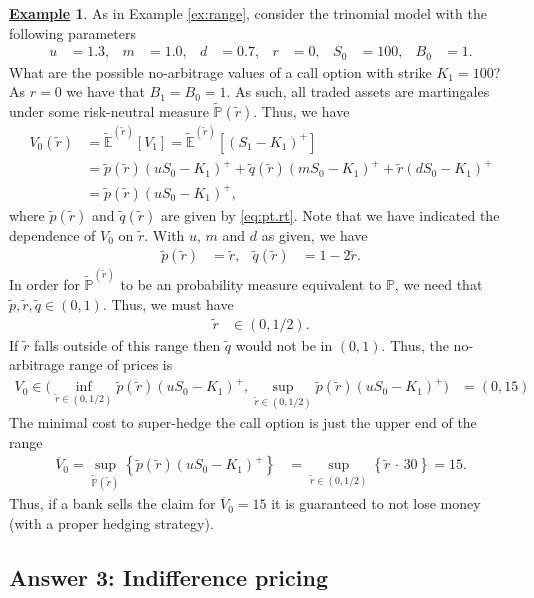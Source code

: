 \documentclass[12pt]{book}
\numberwithin{equation}{chapter}
\theoremstyle{plain}
\numberwithin{theorem}{section}
\theoremstyle{definition}
\newtheorem{example}[theorem]{\underline{Example}}
\numberwithin{exercise}{chapter}
\newcommand{\<}{\langle}
\renewcommand{\>}{\rangle}
\renewcommand{\(}{\left(}
\renewcommand{\)}{\right)}
\renewcommand{\[}{\left[}
\renewcommand{\]}{\right]}
\newcommand\Eb{\mathds{E}}
\newcommand\Pb{\mathds{P}}
\newcommand\Ebt{\widetilde{\Eb}}
\newcommand\Pbt{\widetilde{\Pb}}
\newcommand\qt{\widetilde{q}}
\newcommand\rt{\widetilde{r}}
\newcommand{\blu}[1]{\textcolor{blue}{#1}}
\theoremstyle{definition}
\numberwithin{question}{section}
\newcommand\pt{\widetilde{p}}
\begin{document}
\begin{example}
As in Example \ref{ex:range}, consider the trinomial model with the following parameters
\begin{align}
u
	&=	1.3 , &
m
	&=	1.0 , &
d
	&=	0.7 , &
r
	&=	0 , &
S_0
	&=	100 , &
B_0
	&=	1 .
\end{align}
What are the possible no-arbitrage values of a call option with strike $K_1 = 100$?
As $r = 0$ we have that $B_1 = B_0 = 1$.  As such, all traded assets are martingales under some risk-neutral measure $\Pbt(\rt)$.  Thus, we have
\begin{align}
V_0(\rt)
	&=	\Ebt^{(\rt)}[ V_1 ] = \Ebt^{(\rt)}[ (S_1 - K_1)^+ ]\\
	&=	\pt(\rt) ( u S_0 - K_1 )^+ + \qt(\rt) ( m S_0 - K_1 )^+ + \rt ( d S_0 - K_1 )^+ \\
	&=	\pt(\rt) ( u S_0 - K_1 )^+ ,
\end{align}
where $\pt(\rt)$ and $\qt(\rt)$ are given by \eqref{eq:pt.rt}.  
Note that we have indicated the dependence of $V_0$ on $\rt$.
With $u$, $m$ and $d$ as given, we have
\begin{align}
\pt(\rt)
	&=	\rt, &
\qt(\rt)
	&=	1 - 2 \rt .
\end{align}
In order for $\Pbt^{(\rt)}$ to be an probability measure equivalent to $\Pb$, we need that $\pt,\rt,\qt \in (0,1)$.  Thus, we must have
\begin{align}
\rt 
	&\in (0,1/2) .
\end{align}
If $\rt$ falls outside of this range then $\qt$ would not be in $(0,1)$.  Thus, the no-arbitrage range of prices is
\begin{align}
V_0 \in \Big( \inf_{\rt \in (0,1/2)} \pt(\rt) ( u S_0 - K_1 )^+, \sup_{\rt \in (0,1/2)} \pt(\rt) ( u S_0 - K_1 )^+ \Big)
	&=	( 0 , 15 )
\end{align}
The minimal cost to super-hedge the call option is just the upper end of the range
\begin{align}
\overline{V}_0
	=		\sup_{\Pbt (\rt)}  \left\{ \pt (\rt) (u S_0 - K_1)^+	\right\} 
	&=  \sup_{\rt \in (0,1/2)}  \left\{ \rt \, \cdot \, 30	\right\}
	=		15 .
\end{align}
Thus, if a bank sells the claim for $\overline{V}_0 = 15$ it is guaranteed to not lose money (with a proper hedging strategy).
\end{example}

\subsection{Answer 3: Indifference pricing}
\end{document}
